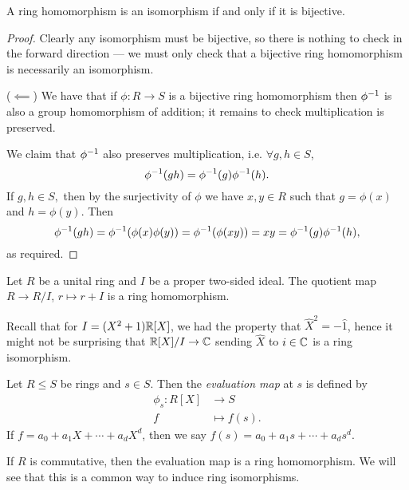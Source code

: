 \begin{theorem}
  A ring homomorphism is an isomorphism if and only if it is bijective.
  \label{<+label+>}
\end{theorem}
\begin{proof}
  Clearly any isomorphism must be bijective, so there is nothing to check in the forward direction --- we must only check that a bijective ring homomorphism is necessarily an isomorphism.
  
  ($\impliedby$) We have that if $\phi:R\to S$ is a bijective ring homomorphism then $\phi^{-1}$ is also a group
  homomorphism of addition; it remains to check multiplication is preserved.

  We claim that $\phi^{-1}$ also preserves multiplication, i.e.
  $\forall g,h\in S$, $$\phi^{-1}(gh)=\phi^{-1}(g)\phi^{-1}(h).$$
  If $g,h \in S,$ then by the surjectivity of $\phi$ we have $x,y \in R$ such that $g =\phi(x)$ and $h=\phi(y)$. Then
  $$
  \phi^{-1}(gh) = \phi^{-1}(\phi(x)\phi(y)) = \phi^{-1}(\phi(xy)) = xy = \phi^{-1}(g) \phi^{-1}(h),
  $$
  as required.
\end{proof}

\begin{example}
  Let $R$ be a unital ring and $I$ be a proper two-sided ideal. The quotient map $R\to
  R/I$,  $r\mapsto r+I$ is a ring homomorphism.

 
  Recall that for $I=(X^2+1)\mathbb R[X]$, we had the
  property that $\hat{X}^2=-\hat{1}$, hence it might not be surprising that
  $\mathbb R[X]/I\to\mathbb C$ sending $\hat{X}$ to $i\in\mathbb C$ is a ring isomorphism. 
\end{example}

\begin{definition}
    Let $R\leq S$ be rings and $s \in S$. Then the \emph{evaluation map} at $s$ is defined by 
    \begin{align*}
        \phi_{s}: R[X] &\to S \\
        f &\mapsto f(s).
    \end{align*}
    If $f = a_0 + a_1X + \cdots + a_dX^d$, then we say $f(s) = a_0 + a_1s + \cdots + a_ds^d$.
\end{definition}

\begin{remark}
    If $R$ is commutative, then the evaluation map is a ring homomorphism. We will see that this is a common way to induce ring isomorphisms.
\end{remark}

